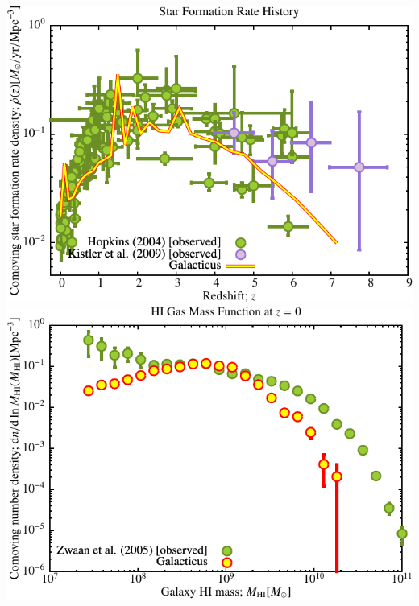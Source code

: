 \includegraphics[scale=0.6]{drd5_r256/Plot_Star_Formation_History.pdf}
\includegraphics[scale=0.6]{drd5_r256/Plot_HI_Mass_Function.pdf}

